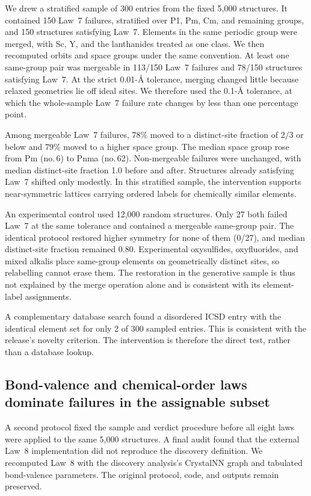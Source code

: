 We drew a stratified sample of 300 entries from the fixed 5{,}000 structures.
It contained 150 Law~7 failures, stratified over P1, Pm, Cm, and remaining groups,
and 150 structures satisfying Law~7. Elements in the same periodic group were
merged, with Sc, Y, and the lanthanides treated as one class. We then recomputed
orbits and space groups under the same convention.
At least one same-group pair was mergeable in 113/150 Law~7 failures and 78/150
structures satisfying Law~7. At the strict 0.01-\AA{} tolerance, merging changed
little because relaxed geometries lie off ideal sites. We therefore used the
0.1-\AA{} tolerance, at which the whole-sample Law~7 failure rate changes by less
than one percentage point.

Among mergeable Law~7 failures, 78\% moved to a distinct-site fraction of $2/3$
or below and 79\% moved to a higher space group. The median space group rose from
Pm (no.\,6) to Pnma (no.\,62). Non-mergeable failures were unchanged, with median
distinct-site fraction 1.0 before and after. Structures already satisfying Law~7
shifted only modestly. In this stratified sample, the intervention supports
near-symmetric lattices carrying ordered labels for chemically similar elements.

An experimental control used 12{,}000 random structures. Only 27 both failed
Law~7 at the same tolerance and contained a mergeable same-group pair. The
identical protocol restored higher symmetry for none of them (0/27), and median
distinct-site fraction remained 0.80. Experimental oxysulfides, oxyfluorides,
and mixed alkalis place same-group elements on geometrically distinct sites, so
relabelling cannot erase them. The restoration in the generative sample is thus
not explained by the merge operation alone and is consistent with its
element-label assignments.

A complementary database search found a disordered ICSD entry with the identical element
set for only 2 of 300 sampled entries. This is consistent with the release's novelty
criterion. The intervention is therefore the direct test, rather than a database
lookup.

\subsection{Bond-valence and chemical-order laws dominate failures in the assignable subset}

A second protocol fixed the sample and verdict procedure before all eight laws
were applied to the same 5{,}000 structures. A final audit found that the external
Law~8 implementation did not reproduce the discovery definition. We recomputed
Law~8 with the discovery analysis's CrystalNN graph and tabulated bond-valence
parameters. The original protocol, code, and outputs remain preserved.

